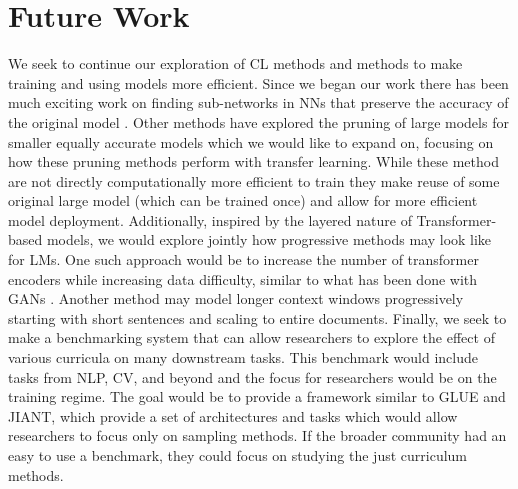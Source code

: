 \chapter{Future Work}
\label{chap:future}
We seek to continue our exploration of CL methods and methods to make training and using models more efficient. Since we began our work there has been much exciting work on finding sub-networks in NNs that preserve the accuracy of the original model \cite{Frankle2019TheLT}. Other methods have explored the pruning of large models for smaller equally accurate models \cite{Han2016DeepCC} \cite{Yu2017ScalpelCD} \cite{Wynter2020OptimalSE} which we would like to expand on, focusing on how these pruning methods perform with transfer learning. While these method are not directly computationally more efficient to train they make reuse of some original large model (which can be trained once) and allow for more efficient model deployment. Additionally, inspired by the layered nature of Transformer-based models, we would explore jointly how progressive methods may look like for LMs. One such approach would be to increase the number of transformer encoders while increasing data difficulty, similar to what has been done with GANs \cite{Karras2017ProgressiveGO}. Another method may model longer context windows progressively starting with short sentences and scaling to entire documents. Finally, we seek to make a benchmarking system that can allow researchers to explore the effect of various curricula on many downstream tasks. This benchmark would include tasks from NLP, CV, and beyond and the focus for researchers would be on the training regime. The goal would be to provide a framework similar to GLUE and JIANT, which provide a set of architectures and tasks which would allow researchers to focus only on sampling methods. If the broader community had an easy to use a benchmark, they could focus on studying the just curriculum methods. 